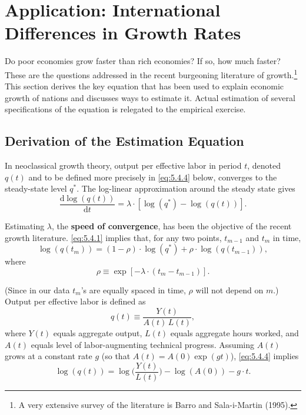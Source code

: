
\section{Application: International Differences in Growth Rates}
\label{sec:5.4}

Do poor economies grow faster than rich economies? If so, how much faster?
These are the questions addressed in the recent burgeoning literature of growth.\footnote{A
very extensive survey of the literature is Barro and Sala-i-Martin (1995).}
This section derives the key equation that has been used to explain economic
growth of nations and discusses ways to estimate it. Actual estimation of several
specifications of the equation is relegated to the empirical exercise.

\subsection*{Derivation of the Estimation Equation}

In neoclassical growth theory, output per effective labor in period $t$, denoted $q(t)$
and to be defined more precisely in \eqref{eq:5.4.4} below, converges to the steady-state
level $q^*$. The log-linear approximation around the steady state gives
\begin{equation}
  \frac{\mathrm{d}\log(q(t))}{\mathrm{d}t}
  = \lambda \cdot [\log(q^*) - \log(q(t))].
  \label{eq:5.4.1} \tag{5.4.1}
\end{equation}

Estimating $\lambda$, the \textbf{speed of convergence}, has been the objective of the recent
growth literature. \eqref{eq:5.4.1} implies that, for any two points, $t_{m-1}$ and $t_m$ in time,
\begin{equation}
  \log(q(t_m)) = (1 - \rho) \cdot \log(q^*) + \rho \cdot \log(q(t_{m-1})),
  \label{eq:5.4.2} \tag{5.4.2}
\end{equation}
where
\begin{equation}
  \rho \equiv \exp[-\lambda \cdot (t_m - t_{m-1})].
  \label{eq:5.4.3} \tag{5.4.3}
\end{equation}

(Since in our data $t_m$'s are equally spaced in time, $\rho$ will not depend on $m$.)
Output per effective labor is defined as
\begin{equation}
  q(t) \equiv \frac{Y(t)}{A(t)\,L(t)},
  \label{eq:5.4.4} \tag{5.4.4}
\end{equation}
where $Y(t)$ equals aggregate output, $L(t)$ equals aggregate hours worked, and $A(t)$
equals level of labor-augmenting technical progress. Assuming $A(t)$ grows at a
constant rate $g$ (so that $A(t) = A(0)\exp(gt)$), \eqref{eq:5.4.4} implies
\begin{equation}
  \log(q(t)) = \log\biggl(\frac{Y(t)}{L(t)}\biggr) - \log(A(0)) - g \cdot t.
  \label{eq:5.4.5} \tag{5.4.5}
\end{equation}


